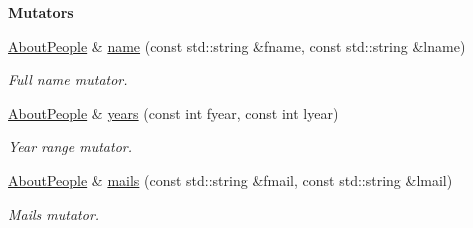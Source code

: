 \begin{Indent}{\bf Mutators}\par
\begin{DoxyCompactItemize}
\item 
\hyperlink{exceptionmagrathea_1_1AboutPeople}{About\-People} \& \hyperlink{exceptionmagrathea_1_1AboutPeople_a418087c00c1a63cffa46cc3523bbdd0e}{name} (const std\-::string \&fname, const std\-::string \&lname)
\begin{DoxyCompactList}\small\item\em Full name mutator. \end{DoxyCompactList}\item 
\hyperlink{exceptionmagrathea_1_1AboutPeople}{About\-People} \& \hyperlink{exceptionmagrathea_1_1AboutPeople_aac78faa800a86567c0913ed6e729eb66}{years} (const int fyear, const int lyear)
\begin{DoxyCompactList}\small\item\em Year range mutator. \end{DoxyCompactList}\item 
\hyperlink{exceptionmagrathea_1_1AboutPeople}{About\-People} \& \hyperlink{exceptionmagrathea_1_1AboutPeople_ab40b0b76127af660951417ba3032693d}{mails} (const std\-::string \&fmail, const std\-::string \&lmail)
\begin{DoxyCompactList}\small\item\em Mails mutator. \end{DoxyCompactList}\end{DoxyCompactItemize}
\end{Indent}
